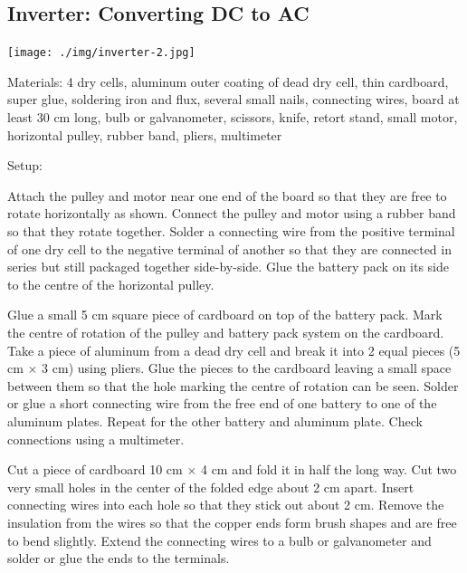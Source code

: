\subsection{Inverter: Converting DC to AC} \label{sub:inverter}

\begin{center}
\texttt{[image: ./img/inverter-2.jpg]}
\end{center}

\begin{multicols}{2}

\begin{description*}
\item[Materials:]{4 dry cells, aluminum outer coating of dead dry cell, thin cardboard, super glue, soldering iron and flux, several small nails, connecting wires, board at least 30 cm long, bulb or galvanometer, scissors, knife, retort stand, small motor, horizontal pulley, rubber band, pliers, multimeter}
\item[Setup:]{Attach the pulley and motor near one end of the board so that they are free to rotate horizontally as shown. Connect the pulley and motor using a rubber band so that they rotate together. Solder a connecting wire from the positive terminal of one dry cell to the negative terminal of another so that they are connected in series but still packaged together side-by-side. Glue the battery pack on its side to the centre of the horizontal pulley. 

Glue a small 5 cm square piece of cardboard on top of the battery pack. Mark the centre of rotation of the pulley and battery pack system on the cardboard. Take a piece of aluminum from a dead dry cell and break it into 2 equal pieces (5 cm $\times$ 3 cm) using pliers. Glue the pieces to the cardboard leaving a small space between them so that the hole marking the centre of rotation can be seen. Solder or glue a short connecting wire from the free end of one battery to one of the aluminum plates. Repeat for the other battery and aluminum plate. Check connections using a multimeter. 

Cut a piece of cardboard 10 cm $\times$ 4 cm and fold it in half the long way. Cut two very small holes in the center of the folded edge about 2 cm apart. Insert connecting wires into each hole so that they stick out about 2 cm. Remove the insulation from the wires so that the copper ends form brush shapes and are free to bend slightly. Extend the connecting wires to a bulb or galvanometer and solder or glue the ends to the terminals.

}
\end{description*}
\end{multicols}
